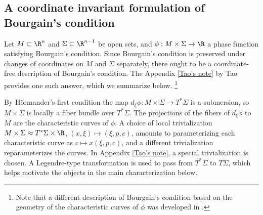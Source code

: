 \documentclass{article}
\numberwithin{equation}{section}
\theoremstyle{plain}
\begin{document}
\subsection{A coordinate invariant formulation of Bourgain's condition}



Let $M \subset \R^n$ and $\Sigma \subset \R^{n-1}$ be open sets, and $\phi : M \times \Sigma \to \R$ a phase function satisfying Bourgain's condition. Since Bourgain's condition is preserved under changes of coordinates on $M$ and $\Sigma$ separately, there ought to be a coordinate-free description of Bourgain's condition. The Appendix \ref{Tao's note} by Tao provides one such answer, which we summarize below. \footnote{Note that a different description of Bourgain's condition based on the geometry of the characteristic curves of $\phi$ was developed in \cite{nadjimzadah2026bourgainsconditionstickykakeya}.} 

By H\"ormander's first condition the map $d_\xi \phi : M \times \Sigma \to T^* \Sigma$ is a submersion, so $M \times \Sigma$ is locally a fiber bundle over $T^* \Sigma$. The projections of the fibers of $d_\xi \phi$ to $M$ are the characteristic curves of $\phi$. A choice of local trivialization $M \times \Sigma \approx T^* \Sigma \times \R$, $(x,\xi) \mapsto (\xi,p,c)$, amounts to parameterizing each characteristic curve as $c \mapsto x(\xi,p,c)$, and a different trivialization reparameterizes the curves. In Appendix \ref{Tao's note}, a special trivialization is chosen. A Legendre-type transformation is used to pass from $T^* \Sigma$ to $T \Sigma$, which helps motivate the objects in the main characterization below. 
\end{document}
